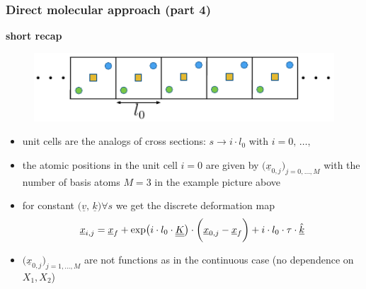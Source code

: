 \begin{frame}
  \frametitle{Direct molecular approach (part 4)}

  \textbf{short recap}
  \begin{figure}
    \centering
    \includegraphics[width=17cm, keepaspectratio=true]{sections/cosserat_rods/images/1D-Crystal2}
  \end{figure}
  \begin{itemize}
    \item unit cells are the analogs of cross sections: $s \rightarrow i \cdot l_0$ with $i = 0, \, \dots,$
    \item the atomic positions in the unit cell $i=0$ are given by $\bigl( \underline{x}_{0,j} \bigr)_{j=0,\dots,M}$ \newline with the number of basis atoms $M=3$ in the example picture above
    \item for constant $\bigl( \underline{v} , \, \underline{k} \bigr) \forall s$ we get the discrete deformation map
        \begin{displaymath}
          \underline{x}_{i,j} = 
          \underline{x}_f + \exp \bigl( i \cdot l_0 \cdot \underline{\underline{K}} \bigr) \cdot \biggl( \underline{x}_{0,j} - \underline{x}_f \biggr) + 
          i \cdot l_0 \cdot \tau \cdot \underline{\hat{k}}
        \end{displaymath}
    \item $\bigl( \underline{x}_{0,j} \bigr)_{j=1,\dots,M}$ are not functions as in the continuous case (no dependence on $X_1,X_2$)
  \end{itemize}
\end{frame}


